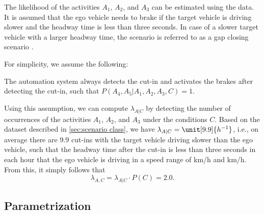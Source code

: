 The likelihood of the activities $A_1$, $A_2$, and $A_3$ can be estimated using the data. It is assumed that the ego vehicle needs to brake if the target vehicle is driving slower and the headway time is less than three seconds. In case of a slower target vehicle with a larger headway time, the scenario is referred to as a gap closing scenario \cite{semsarkazerooni2016cacc, gelder2016pacc}.

For simplicity, we assume the following:
\begin{assumption}
	The automation system always detects the cut-in and activates the brakes after detecting the cut-in, such that $P(A_4,A_5|A_1,A_2,A_3,C) = 1$.
\end{assumption}

Using this assumption, we can compute $\lambda_{A|C}$ by detecting the number of occurrences of the activities $A_1$, $A_2$, and $A_3$ under the conditions $C$. Based on the dataset described in \cref{sec:scenario class}, we have $\lambda_{A|C}=\unit[9.9]{h^{-1}}$, i.e., on average there are $9.9$ cut-ins with the target vehicle driving slower than the ego vehicle, such that the headway time after the cut-in is less than three seconds in each hour that the ego vehicle is driving in a speed range of \unit[60]{km/h} and \unit[130]{km/h}. From this, it simply follows that
\begin{equation}
	\lambda_{A,C} = \lambda_{A|C} \cdot P(C) = 2.0.
\end{equation}



\subsection{Parametrization}
\label{sec:example parametrization}

